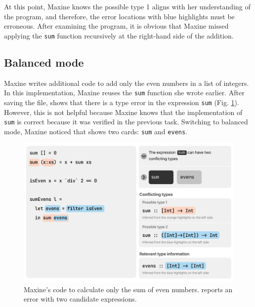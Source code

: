 At this point, Maxine knows the possible type 1 aligns with her understanding of
the program, and therefore, the error locations with blue highlights must be
erroneous. After examining the program, it is obvious that Maxine missed
applying the \texttt{sum} function recursively at the right-hand side of the
addition. 


\subsection{Balanced mode} \label{sub:balanced}


Maxine writes additional code to add only the even numbers in a list of integers.
In this implementation, Maxine reuses the \texttt{sum} function she wrote
earlier. After saving the file, \chameleon{} shows that there is a type error in the
expression \texttt{sum} (Fig. \ref{fig:balance-mode-1}). However, this is not   
helpful because Maxine knows that the implementation of  \texttt{sum} is correct 
because it was verified in the previous task. Switching to
balanced mode, Maxine noticed that \chameleon{} shows two cards: \texttt{sum}
and \texttt{evens}. 

\begin{figure}
        \centering
        \includegraphics[width=\linewidth]{images/balanced-mode-1.pdf}
        \caption{
            Maxine's code to calculate only the sum 
            of even numbers. \chameleon{} reports 
            an error with two candidate expressions.
        }
        \label{fig:balance-mode-1}
\end{figure}


